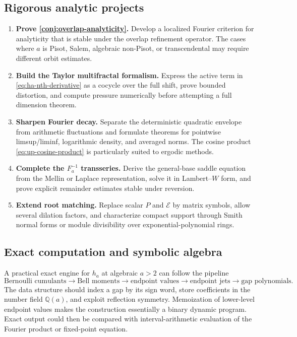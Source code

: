 \documentclass[11pt]{article}
\theoremstyle{definition}
\theoremstyle{remark}
\begin{document}
\subsection{Rigorous analytic projects}

\begin{enumerate}[label=\arabic*.]
  \item \textbf{Prove \cref{conj:overlap-analyticity}.}  Develop a localized Fourier criterion for analyticity that is stable under the overlap refinement operator.  The cases where \(a\) is Pisot, Salem, algebraic non-Pisot, or transcendental may require different orbit estimates.

  \item \textbf{Build the Taylor multifractal formalism.}  Express the active term in \eqref{eq:ha-nth-derivative} as a cocycle over the full shift, prove bounded distortion, and compute pressure numerically before attempting a full dimension theorem.

  \item \textbf{Sharpen Fourier decay.}  Separate the deterministic quadratic envelope from arithmetic fluctuations and formulate theorems for pointwise limsup/liminf, logarithmic density, and averaged norms.  The cosine product \eqref{eq:up-cosine-product} is particularly suited to ergodic methods.

  \item \textbf{Complete the \(F_a^{-1}\) transseries.}  Derive the general-base saddle equation from the Mellin or Laplace representation, solve it in Lambert--\(W\) form, and prove explicit remainder estimates stable under reversion.

  \item \textbf{Extend root matching.}  Replace scalar \(P\) and \(\mathcal E\) by matrix symbols, allow several dilation factors, and characterize compact support through Smith normal forms or module divisibility over exponential-polynomial rings.
\end{enumerate}

\subsection{Exact computation and symbolic algebra}

A practical exact engine for \(h_a\) at algebraic \(a>2\) can follow the pipeline
\begin{equation}
 \text{Bernoulli cumulants}
 \to \text{Bell moments}
 \to \text{endpoint values}
 \to \text{endpoint jets}
 \to \text{gap polynomials}.
 \label{eq:exact-engine-pipeline}
\end{equation}
The data structure should index a gap by its sign word, store coefficients in the number field \(\mathbb Q(a)\), and exploit reflection symmetry.  Memoization of lower-level endpoint values makes the construction essentially a binary dynamic program.  Exact output could then be compared with interval-arithmetic evaluation of the Fourier product or fixed-point equation.
\end{document}
